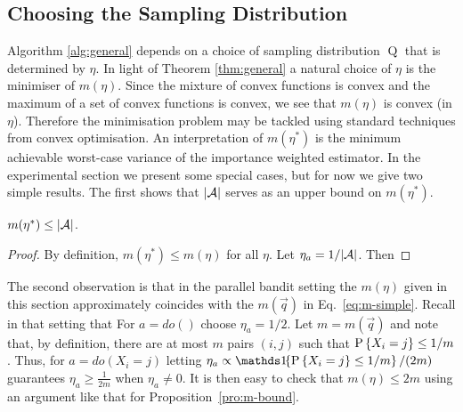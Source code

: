 \subsection*{Choosing the Sampling Distribution}

Algorithm \ref{alg:general} depends on a choice of sampling distribution $\operatorname{Q}$ that is determined by $\eta$. In light of Theorem \ref{thm:general}
a natural choice of $\eta$ is the minimiser of $m(\eta)$.
Since the mixture of convex functions is convex and the maximum of a set of convex functions is convex, we see that $m(\eta)$ is convex (in $\eta$).
Therefore the minimisation problem may be tackled using standard techniques from convex optimisation. 
An interpretation of $m(\eta^*)$ is the minimum achievable worst-case variance of the importance weighted estimator.
In the experimental section we present some special cases,
but for now we give two simple results. The first shows that $|\calA|$ serves as an upper bound on $m(\eta^*)$.

\begin{proposition}\label{pro:m-bound}
$m(\eta^*) \leq |\calA|$.
\end{proposition}

\begin{proof}
By definition, $m(\eta^*) \leq m(\eta)$ for all $\eta$. Let $\eta_a = 1/|\calA|$. Then
\end{proof}

The second observation is that in the parallel bandit setting the $m(\eta)$ given in this section approximately coincides with the $m(\vec{q})$ in Eq.\ \ref{eq:m-simple}.
Recall in that setting that 
For $a = do()$ choose $\eta_a = 1/2$. 
Let $m = m(\vec{q})$ and note that, by definition, there are at most $m$ pairs $(i,j)$ such that $\P{X_i = j} \leq 1/m$.
Thus, for $a = do(X_i = j)$ letting $\eta_a \propto \ind{\P{X_i = j} \leq 1/m} / (2m)$ guarantees $\eta_a \ge \frac{1}{2m}$ when $\eta_a \ne 0$.
It is then easy to check that $m(\eta) \leq 2m$ using an argument like that for Proposition~\ref{pro:m-bound}.

